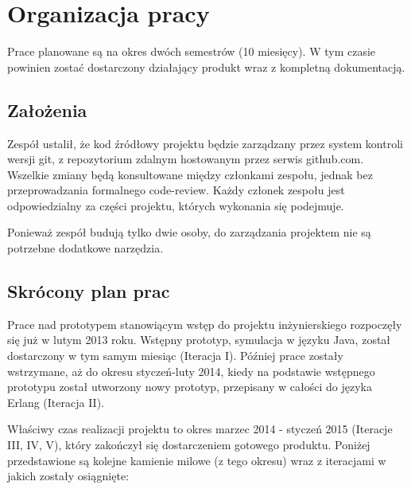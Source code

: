 \section{Organizacja pracy}
\label{sec:organizacja-pracy}
Prace planowane są na okres dwóch semestrów (10 miesięcy). W tym czasie powinien zostać dostarczony działający produkt wraz z kompletną dokumentacją.

\subsection{Założenia}
Zespół ustalił, że kod źródłowy projektu będzie zarządzany przez system kontroli wersji git, z repozytorium zdalnym hostowanym przez serwis github.com. Wszelkie zmiany będą konsultowane między członkami zespołu, jednak bez przeprowadzania formalnego code-review. Każdy członek zespołu jest odpowiedzialny za części projektu, których wykonania się podejmuje.

Ponieważ zespół budują tylko dwie osoby, do zarządzania projektem nie są potrzebne dodatkowe narzędzia.

\subsection{Skrócony plan prac}
Prace nad prototypem stanowiącym wstęp  do projektu inżynierskiego rozpoczęły się już w lutym 2013 roku. Wstępny prototyp, symulacja w języku Java, został dostarczony w tym samym miesiąc (Iteracja I). Później prace zostały wstrzymane, aż do okresu styczeń-luty 2014, kiedy na podstawie wstępnego prototypu został utworzony nowy prototyp, przepisany w całości do języka Erlang (Iteracja II).

Właściwy czas realizacji projektu to okres marzec 2014 - styczeń 2015 (Iteracje III, IV, V), który zakończył się dostarczeniem gotowego produktu. Poniżej przedstawione są kolejne kamienie milowe (z tego okresu) wraz z iteracjami w jakich zostały osiągnięte:

